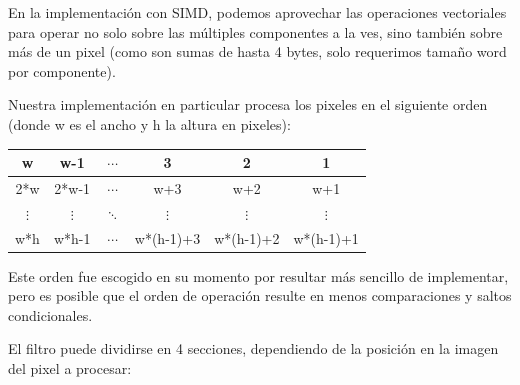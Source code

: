 En la implementación con SIMD, podemos aprovechar las operaciones vectoriales para operar no solo sobre las múltiples componentes a la ves, sino también sobre más de un pixel (como son sumas de hasta 4 bytes, solo requerimos tamaño word por componente).

Nuestra implementación en particular procesa los pixeles en el siguiente orden (donde w es el ancho y h la altura en pixeles):

\begin{center}
  \begin{tabular}{ | c | c | c | c | c | c |}
    \hline
    w & w-1 & $\cdots$ & 3 & 2 & 1 \\ \hline
    2*w & 2*w-1 & $\cdots$ & w+3 & w+2 & w+1 \\ \hline
    $\vdots$ & $\vdots$ & $\ddots$ & $\vdots$ & $\vdots$ & $\vdots$ \\ \hline
    w*h & w*h-1 & $\cdots$ & w*(h-1)+3 & w*(h-1)+2 & w*(h-1)+1 \\
    \hline
  \end{tabular}
\end{center}

Este orden fue escogido en su momento por resultar más sencillo de implementar, pero es posible que el orden de operación resulte en menos comparaciones y saltos condicionales.

El filtro puede dividirse en 4 secciones, dependiendo de la posición en la imagen del pixel a procesar:

